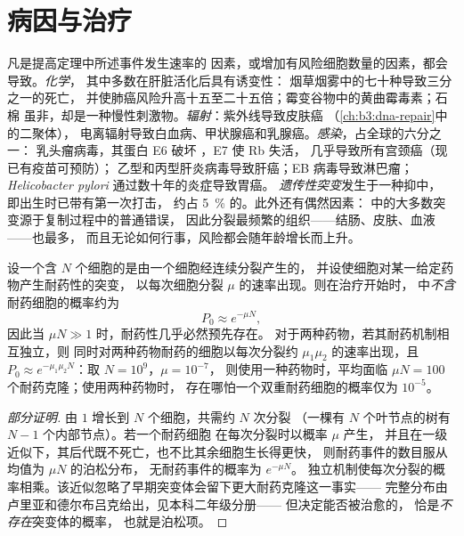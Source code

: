 \section{病因与治疗}

\begin{proposition}[病因]\label{prop:b3:cancer-biology:causes}
凡是提高定理中所述事件发生速率的
因素，或增加有风险细胞数量的因素，都会导致。\emph{化学}，
其中多数在肝脏活化后具有诱变性：
烟草烟雾中的七十种导致三分之一的死亡，
并使肺癌风险升高十五至二十五倍；霉变谷物中的黄曲霉毒素；石棉
虽非，却是一种慢性刺激物。\emph{辐射}：紫外线导致皮肤癌
（\cref{ch:b3:dna-repair}中的二聚体），
电离辐射导致白血病、甲状腺癌和乳腺癌。\emph{感染}，占全球的六分之一：
乳头瘤病毒，其蛋白 E6 破坏 ，E7 使 Rb 失活，
几乎导致所有宫颈癌（现已有疫苗可预防）；
乙型和丙型肝炎病毒导致肝癌；EB 病毒导致淋巴瘤；
\emph{Helicobacter pylori} 通过数十年的炎症导致胃癌。
\emph{遗传性突变}发生于一种抑中，
即出生时已带有第一次打击，
约占 \qty{5}{\%} 的。此外还有偶然因素：
中的大多数突变源于复制过程中的普通错误，
因此分裂最频繁的组织——结肠、皮肤、血液——也最多，
而且无论如何行事，风险都会随年龄增长而上升。
\end{proposition}

\begin{theorem}[为何一种药物会失败而两种可能不会]\label{thm:b3:cancer-biology:goldie-coldman}
设一个含 $N$ 个细胞的是由一个细胞经连续分裂产生的，
并设使细胞对某一给定药物产生耐药性的突变，
以每次细胞分裂 $\mu$ 的速率出现。则在治疗开始时，
中\emph{不含}耐药细胞的概率约为
\[
P_{0} \approx e^{-\mu N},
\]
因此当 $\mu N \gg 1$ 时，耐药性几乎必然预先存在。
对于两种药物，若其耐药机制相互独立，则
同时对两种药物耐药的细胞以每次分裂约 $\mu_{1}\mu_{2}$ 的速率出现，且 $P_{0}
\approx e^{-\mu_{1}\mu_{2}N}$：取 $N = 10^{9}$，$\mu = 10^{-7}$，
则使用一种药物时，平均面临 $\mu N = 100$ 个耐药克隆；使用两种药物时，
存在哪怕一个双重耐药细胞的概率仅为 $10^{-5}$。
\end{theorem}
\begin{proof}[部分证明]
由 $1$ 增长到 $N$ 个细胞，共需约 $N$ 次分裂
（一棵有 $N$ 个叶节点的树有 $N - 1$ 个内部节点）。若一个耐药细胞
在每次分裂时以概率 $\mu$ 产生，
并且在一级近似下，其后代既不死亡，也不比其余细胞生长得更快，
则耐药事件的数目服从均值为 $\mu N$ 的泊松分布，
无耐药事件的概率为 $e^{-\mu N}$。
独立机制使每次分裂的概率相乘。该近似忽略了早期突变体会留下更大耐药克隆这一事实——
完整分布由卢里亚和德尔布吕克给出，见本科二年级分册——
但决定能否被治愈的，
恰是\emph{不存在}突变体的概率，
也就是泊松项。
\end{proof}


